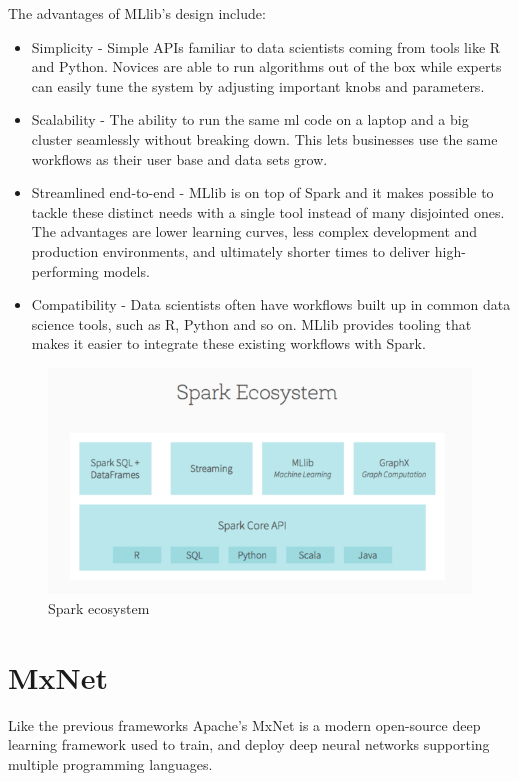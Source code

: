 \documentclass[thesis=M,english]{FITthesis}[2012/06/26]
\begin{document}
The advantages of MLlib’s design include:

\begin{itemize}[nosep]
\item Simplicity
- Simple APIs familiar to data scientists coming from tools like R and Python. Novices are able to run algorithms out of the box while experts can easily tune the system by adjusting important knobs and parameters.
\item Scalability
- The ability to run the same \acrshort{ml} code on a laptop and a big cluster seamlessly without breaking down. This lets businesses use the same workflows as their user base and data sets grow.
\item Streamlined end-to-end
- MLlib is on top of Spark and it makes possible to tackle these distinct needs with a single tool instead of many disjointed ones. The advantages are lower learning curves, less complex development and production environments, and ultimately shorter times to deliver high-performing models.
\item Compatibility
- Data scientists often have workflows built up in common data science tools, such as R, Python and so on. MLlib provides tooling that makes it easier to integrate these existing workflows with Spark. 
\end{itemize}


\begin{figure}[h!]\centering
	\includegraphics[width=1\textwidth]{pictures/ml_spark_ecosystem}
	\caption{Spark ecosystem \cite{ml_spark_advantages}}\label{fig:ml_spark_ecosystem}
\end{figure}
\pagebreak
\section{MxNet}

\cite{ml_mxnet} Like the previous frameworks Apache's MxNet is a modern open-source deep learning framework used to train, and deploy deep neural networks supporting multiple programming languages.
\end{document}
